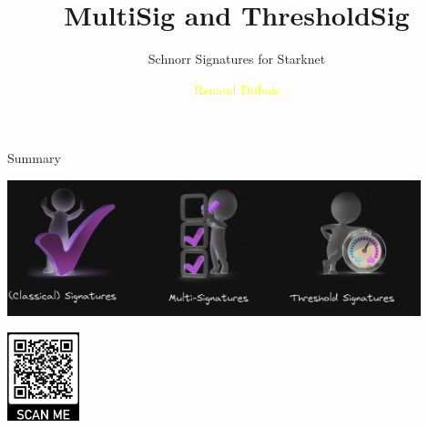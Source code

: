 \documentclass[aspectratio=43]{beamer}
\title{MultiSig and ThresholdSig} %
\subtitle{Schnorr  Signatures for Starknet}
\author[R. Dubois]{\textcolor{yellow}{Renaud Dubois} }
\institute[LIT]{
    \textcolor{white}{Ledger}%
    \\%
    \textcolor{white}{Innovation Team}%
    \date{\today}
    
    
} %
\begin{document}
    
    \frame{\titlepage }
   

    \begin{frame}{Summary}
     
     {
     \begin{center}
     \includegraphics[width=12cm]{images/concepts.jpg}
     \end{center}
     }
     {
        \tableofcontents
        \begin{center}
        \includegraphics[width=2.1cm]{images/qrslides.jpg}
        \end{center}
      }  
   
    \end{frame} 
\end{document}
